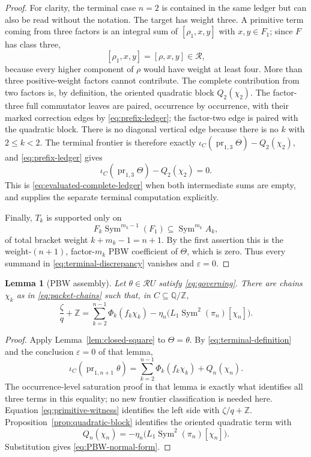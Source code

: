 \documentclass[11pt]{amsart}
\newtheorem{lemma}[theorem]{Lemma}
\theoremstyle{remark}
\newcommand{\Z}{\mathbb Z}
\newcommand{\Q}{\mathbb Q}
\newcommand{\Sym}{\operatorname{Sym}}
\newcommand{\Rel}{\mathcal R}
\newcommand{\pr}{\operatorname{pr}}
\begin{document}
\begin{proof}
	For clarity, the terminal case $n=2$ is contained in the same ledger
	but can also be read without the notation.  The target has weight three.
	A primitive term coming from three factors is an integral sum of
	$[\rho_1,x,y]$ with $x,y\in F_1$; since $F$ has class three,
	\[
	 [\rho_1,x,y]=[\rho,x,y]\in\Rel,
	\]
	because every higher component of $\rho$ would have weight at least
	four.  More than three positive-weight factors cannot contribute.
	The complete contribution from two factors is, by definition, the
	oriented quadratic block $Q_2(\chi_2)$.  The factor-three full
	commutator leaves are paired, occurrence by occurrence, with their
	marked correction edges by \eqref{eq:prefix-ledger}; the factor-two
	edge is paired with the quadratic block.  There is no diagonal vertical
	edge because there is no $k$ with $2\leq k<2$.  The terminal frontier is
	therefore exactly
	$\iota_C(\pr_{1,3}\Theta)-Q_2(\chi_2)$, and
	\eqref{eq:prefix-ledger} gives
	\[
	 \iota_C(\pr_{1,3}\Theta)-Q_2(\chi_2)=0.
	\]
	This is \eqref{eq:evaluated-complete-ledger} when both intermediate sums
	are empty, and supplies the separate terminal computation explicitly.

Finally, $T_k$ is supported only on
\[
 F_k\Sym^{m_k-1}(F_1)\subseteq\Sym^{m_k}A_k,
\]
of total bracket weight $k+m_k-1=n+1$.  By the first assertion this is
the weight-$(n+1)$, factor-$m_k$ PBW coefficient of $\Theta$, which is
zero.  Thus every summand in
\eqref{eq:terminal-discrepancy} vanishes and $\varepsilon=0$.
\end{proof}

\begin{lemma}[PBW assembly]\label{lem:PBW-assembly}
Let $\theta\in\Rel U$ satisfy \eqref{eq:governing}.  There are chains
$\chi_k$ as in \eqref{eq:packet-chains} such that, in
$C\subseteq\Q/\Z$,
\begin{equation}\label{eq:PBW-normal-form}
 \frac{\zeta}{q}+\Z
 =\sum_{k=2}^{n-1}\Phi_k(f_k\chi_k)
 -\eta_n\bigl(L_1\Sym^2(\pi_n)[\chi_n]\bigr).
\end{equation}
\end{lemma}

\begin{proof}
Apply Lemma~\ref{lem:closed-square} to $\Theta=\theta$.  By
\eqref{eq:terminal-definition} and the conclusion $\varepsilon=0$ of
that lemma,
\[
 \iota_C(\pr_{1,n+1}\theta)
 =\sum_{k=2}^{n-1}\Phi_k(f_k\chi_k)+Q_n(\chi_n).
\]
The occurrence-level saturation proof in that lemma is exactly what
identifies all three terms in this equality; no new frontier
classification is needed here.  Equation \eqref{eq:primitive-witness}
identifies the left side with $\zeta/q+\Z$.
Proposition~\ref{prop:quadratic-block} identifies the oriented quadratic term with
\[
 Q_n(\chi_n)
 =-\eta_n\bigl(L_1\Sym^2(\pi_n)[\chi_n]\bigr).
\]
Substitution gives \eqref{eq:PBW-normal-form}.
\end{proof}
\end{document}
